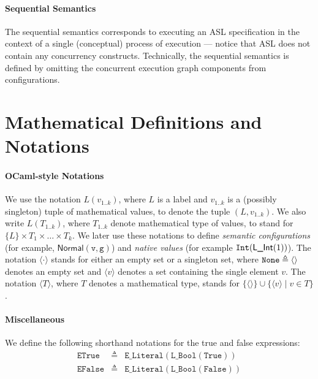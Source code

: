 \documentclass{book}
\newcommand\nvint[0]{\texttt{Int}}
\newcommand\Normal[0]{\textsf{Normal}}
\newcommand\vg[0]{\texttt{g}}
\newcommand\vv[0]{\texttt{v}}
\begin{document}
\paragraph{Sequential Semantics}
The sequential semantics corresponds to executing an ASL specification in the context of a single (conceptual) process
of execution --- notice that ASL does not contain any concurrency constructs.
%
Technically, the sequential semantics is defined by omitting the concurrent execution graph components
from configurations.

\section{Mathematical Definitions and Notations}



\paragraph{OCaml-style Notations}
We use the notation $L(v_{1..k})$, where $L$ is a label and $v_{1..k}$ is a (possibly singleton) tuple of mathematical values,
to denote the tuple $(L,v_{1..k})$.
We also write $L(T_{1..k})$, where $T_{1..k}$ denote mathematical type of values, to stand for
$\{L\} \times T_1 \times \ldots \times T_k$.
%
We later use these notations to define \emph{semantic configurations} (for example, $\Normal(\vv, \vg)$)
and \emph{native values} (for example $\nvint(\lint(1))$).
%
The notation $\langle \cdot \rangle$ stands for either an empty set or a singleton set,
where $\texttt{None}\triangleq\langle\rangle$ denotes an empty set
and $\langle v \rangle$ denotes a set containing the single element $v$.
%
The notation $\langle T \rangle$, where $T$ denotes a mathematical type, stands for
$\{ \langle\rangle \} \cup \{\langle v \rangle \;|\; v \in T\}$.

\paragraph{Miscellaneous}
We define the following shorthand notations for the true and false expressions:
\newcommand\etrue[0]{\texttt{ETrue}}
\newcommand\efalse[0]{\texttt{EFalse}}
\[
\begin{array}{rcl}
  \etrue &\triangleq& \texttt{E\_Literal}(\texttt{L\_Bool}(\texttt{True}))\\
  \efalse &\triangleq& \texttt{E\_Literal}(\texttt{L\_Bool}(\texttt{False}))\\
\end{array}
\]
\end{document}
